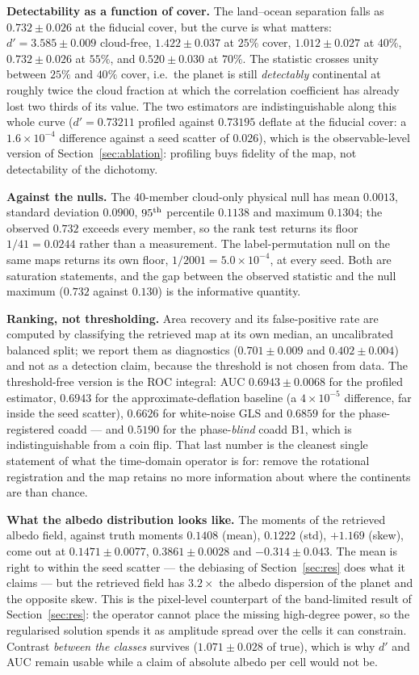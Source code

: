 \documentclass[twocolumn,10pt]{article}
\begin{document}
\textbf{Detectability as a function of cover.} The land--ocean separation falls
as $0.732\pm0.026$ at the fiducial cover, but the curve is what matters:
$d'=3.585\pm0.009$ cloud-free, $1.422\pm0.037$ at $25\%$ cover,
$1.012\pm0.027$ at $40\%$, $0.732\pm0.026$ at $55\%$, and $0.520\pm0.030$ at
$70\%$. The statistic crosses unity between $25\%$ and $40\%$ cover, i.e.\ the
planet is still \emph{detectably} continental at roughly twice the cloud
fraction at which the correlation coefficient has already lost two thirds of its
value. The two estimators are indistinguishable along this whole curve
($d'=0.73211$ profiled against $0.73195$ deflate at the fiducial cover: a
$1.6\times10^{-4}$ difference against a seed scatter of $0.026$), which is the
observable-level version of Section~\ref{sec:ablation}: profiling buys fidelity
of the map, not detectability of the dichotomy.

\textbf{Against the nulls.} The $40$-member cloud-only physical null has mean
$0.0013$, standard deviation $0.0900$, $95^{\rm th}$ percentile $0.1138$ and
maximum $0.1304$; the observed $0.732$ exceeds every member, so the rank test
returns its floor $1/41=0.0244$ rather than a measurement. The label-permutation
null on the same maps returns its own floor, $1/2001=5.0\times10^{-4}$, at every
seed. Both are saturation statements, and the gap between the observed statistic
and the null maximum ($0.732$ against $0.130$) is the informative quantity.

\textbf{Ranking, not thresholding.} Area recovery and its false-positive rate are
computed by classifying the retrieved map at its own median, an uncalibrated
balanced split; we report them as diagnostics
($0.701\pm0.009$ and $0.402\pm0.004$) and not as a detection claim, because the
threshold is not chosen from data. The threshold-free version is the ROC
integral: AUC $0.6943\pm0.0068$ for the profiled estimator, $0.6943$ for the
approximate-deflation baseline (a $4\times10^{-5}$ difference, far inside the
seed scatter), $0.6626$ for white-noise GLS and $0.6859$ for the phase-registered
coadd --- and $0.5190$ for the phase-\emph{blind} coadd B1, which is
indistinguishable from a coin flip. That last number is the cleanest single
statement of what the time-domain operator is for: remove the rotational
registration and the map retains no more information about where the continents
are than chance.

\textbf{What the albedo distribution looks like.} The moments of the retrieved
albedo field, against truth moments $0.1408$ (mean), $0.1222$ (std),
$+1.169$ (skew), come out at $0.1471\pm0.0077$, $0.3861\pm0.0028$ and
$-0.314\pm0.043$. The mean is right to within the seed scatter --- the debiasing
of Section~\ref{sec:res} does what it claims --- but the retrieved field has
$3.2\times$ the albedo dispersion of the planet and the opposite skew. This is
the pixel-level counterpart of the band-limited result of
Section~\ref{sec:res}: the operator cannot place the missing high-degree power,
so the regularised solution spends it as amplitude spread over the cells it can
constrain. Contrast \emph{between the classes} survives
($1.071\pm0.028$ of true), which is why $d'$ and AUC remain usable while a claim
of absolute albedo per cell would not be.
\end{document}
